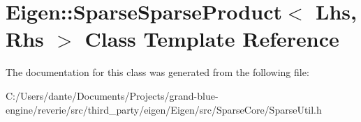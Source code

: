 \hypertarget{class_eigen_1_1_sparse_sparse_product}{}\section{Eigen\+::Sparse\+Sparse\+Product$<$ Lhs, Rhs $>$ Class Template Reference}
\label{class_eigen_1_1_sparse_sparse_product}


The documentation for this class was generated from the following file\+:\begin{DoxyCompactItemize}
\item 
C\+:/\+Users/dante/\+Documents/\+Projects/grand-\/blue-\/engine/reverie/src/third\+\_\+party/eigen/\+Eigen/src/\+Sparse\+Core/Sparse\+Util.\+h\end{DoxyCompactItemize}
